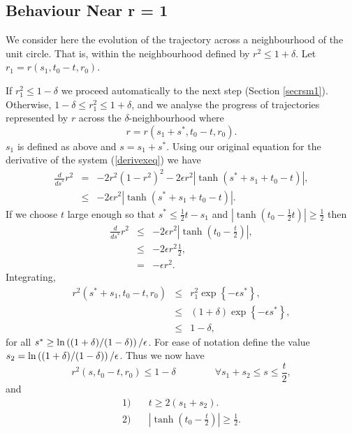 \subsection{Behaviour Near r = 1}

We consider here the evolution of the trajectory across a neighbourhood of the
unit circle.  That is, within the neighbourhood defined by $r^2
\leq 1 + \delta$. Let $r_{1} = r(s_{1},t_{0}-t,r_{0})$.

If $r_{1}^2 \leq 1 - \delta$ we proceed automatically to the next
step (Section \ref{secrsm1}). Otherwise, $1 - \delta \leq r_{1}^2 \leq 1 +
\delta$, and we analyse the progress of trajectories represented by $r$ across
the $\delta$-neighbourhood where
\begin{equation*}
  r = r(s_1 + s^*,t_0-t,r_{0}).
\end{equation*}
$s_{1}$ is defined as above and $s = s_1 +s^*$.
Using our original equation for the derivative of the system
(\ref{derivexeq}) we have
\begin{eqnarray*}
  \frac{d}{ds^*} r^2 & = & - 2r^2(1-r^2)^2 - 2 \epsilon r^2 |\tanh
        (s^*+s_{1}+t_0-t)|, \\
  & \leq & - 2 \epsilon r^2 |\tanh (s^*+s_{1}+t_0-t)|.
\end{eqnarray*}
If we choose $t$ large enough so that $s^* \leq \frac{1}{2}t -
s_1$ and $|\tanh (t_0-\frac{1}{2}t)| \geq \frac{1}{2}$ then
\begin{eqnarray*}
  \frac{d}{ds^*} r^2 & \leq & - 2 \epsilon r^2 |\tanh
                        (t_0-\frac{t}{2})|, \\
  & \leq & - 2 \epsilon r^2 \frac{1}{2}, \\
  & = & -  \epsilon r^2.
\end{eqnarray*}
Integrating,
\begin{eqnarray*}
  r^{2}(s^* +s_{1},t_0-t,r_0) & \leq & r_1^{2}\exp\left\{- \epsilon s^*
                        \right\}, \\
  & \leq & (1+\delta) \exp\left\{- \epsilon s^* \right\}, \\
  & \leq & 1 - \delta,
\end{eqnarray*}
for all $s^* \geq \ln \left((1+\delta)/(1-\delta)\right) / \epsilon$. For
ease of notation define the value \\
$s_2 = \ln \left((1+\delta)/(1-\delta)\right) / \epsilon$. Thus we now have
\begin{equation*}
  r^2(s,t_0-t,r_{0}) \leq 1 - \delta \qquad \qquad \forall  s_{1}+s_2
        \leq s \leq \frac{t}{2},
\end{equation*}
and
\begin{align}
  1) \quad & t \geq 2(s_1+s_2). \nonumber \\
  2) \quad & |\tanh (t_0- \frac{t}{2})| \geq \frac{1}{2} \label{tlargeeq}. \\
  \nonumber
\end{align}

